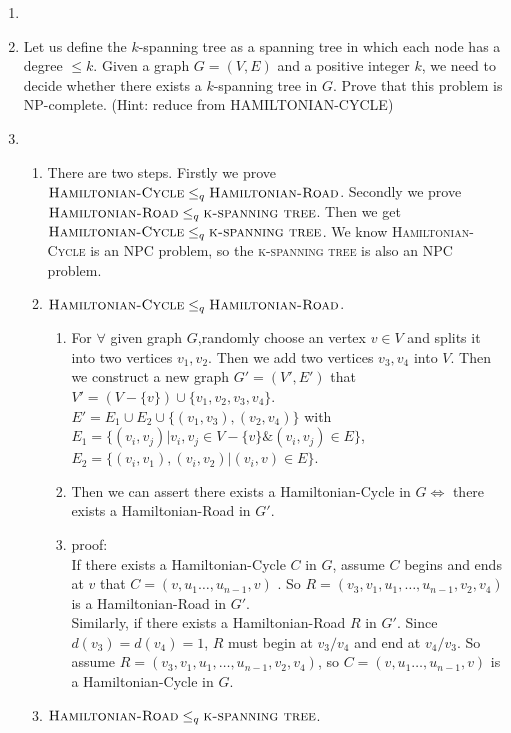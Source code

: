 \documentclass[12pt,a4paper]{article}
\makeatletter
\newtheorem*{solution}{Solution}
\theoremstyle{definition}
\renewenvironment{solution}[1][Solution] {\par\pushQED{\qed}\normalfont\topsep6\p@\@plus6\p@\relax\trivlist\item[\hskip\labelsep\bfseries#1\@addpunct{.}]\ignorespaces}{\popQED\endtrivlist\@endpefalse} \makeatother
\makeatother
\begin{document}
\begin{enumerate}
\begin{solution}
    \end{solution}
    \item Let us define the $k$-spanning tree as a spanning tree in which each node has a degree $\leqslant k$. Given a graph $G= (V,E)$ and a positive integer $k$, we need to decide whether there exists a $k$-spanning tree in $G$. Prove that this problem is NP-complete. (Hint: reduce from \textsc{HAMILTONIAN-CYCLE})
    \begin{solution}
    \begin{enumerate}
    ~\par
        \item There are two steps. Firstly we prove $\textsc{Hamiltonian-Cycle}\leq_q\textsc{Hamiltonian-Road}$. Secondly we prove $\textsc{Hamiltonian-Road}\leq_q\textsc{k-spanning tree}$. Then we get $\textsc{Hamiltonian-Cycle}\leq_q\textsc{k-spanning tree}$. We know \textsc{Hamiltonian-Cycle} is an NPC problem, so the \textsc{k-spanning tree} is also an NPC problem.
        \item $\textsc{Hamiltonian-Cycle}\leq_q\textsc{Hamiltonian-Road}$.\\
        \begin{enumerate}
            \item For $\forall$ given graph $G$,randomly choose an vertex $v\in V$ and splits it into two vertices $v_1,v_2$. Then we add two vertices $v_3,v_4$ into $V$. Then we construct a new graph $G'=(V',E')$ that $V'=(V-\{v\})\cup\{v_1,v_2,v_3,v_4\}$. $E'=E_1\cup E_2\cup \{(v_1,v_3),(v_2,v_4)\}$ with $E_1=\{(v_i,v_j)|v_i,v_j\in V-\{v\} \&  (v_i,v_j)\in E\}$, $E_2=\{(v_i,v_1),(v_i,v_2)|(v_i,v)\in E\}$.\\
            \item Then we can assert there exists a Hamiltonian-Cycle in $G\Longleftrightarrow$  there exists a Hamiltonian-Road in $G'$.
            \item proof:\\
            If there exists a Hamiltonian-Cycle $C$ in $G$, assume $C$ begins and ends at $v$ that $C=(v,u_1\dots,u_{n-1},v)$ . So $R=(v_3,v_1,u_1,\dots,u_{n-1},v_2,v_4)$ is a Hamiltonian-Road in $G'$.\\
            Similarly, if there exists a Hamiltonian-Road $R$ in $G'$. Since $d(v_3)=d(v_4)=1$, $R$ must begin at $v_3/v_4$ and end at $v_4/v_3$. So assume  $R=(v_3,v_1,u_1,\dots,u_{n-1},v_2,v_4)$, so $C=(v,u_1\dots,u_{n-1},v)$ is a Hamiltonian-Cycle in $G$.
        \end{enumerate}
        \item $\textsc{Hamiltonian-Road}\leq_q\textsc{k-spanning tree}$.

\end{enumerate}
\end{solution}
\end{enumerate}
\end{document}
